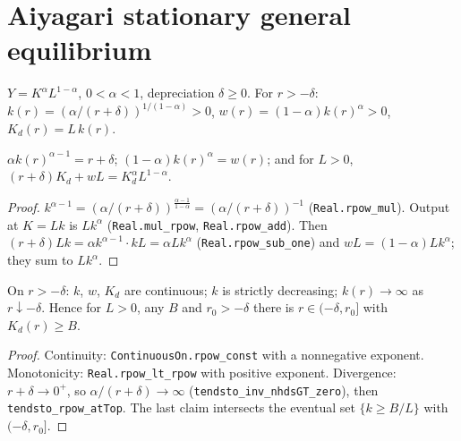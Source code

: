 \section{Aiyagari stationary general equilibrium}
\label{sec:aiyagari_ge}

\begin{definition}
\label{def:cd_firm}
\leanok
$Y = K^\alpha L^{1-\alpha}$, $0<\alpha<1$, depreciation $\delta\ge0$. For $r > -\delta$:
$k(r) = (\alpha/(r+\delta))^{1/(1-\alpha)} > 0$, $w(r) = (1-\alpha)k(r)^\alpha > 0$, $K_d(r) = L\,k(r)$.
\end{definition}

\begin{lemma}
\label{lem:cd_firm_foc}
\leanok
{}
$\alpha k(r)^{\alpha-1} = r+\delta$; $(1-\alpha)k(r)^\alpha = w(r)$; and for $L>0$,
$(r+\delta)K_d + wL = K_d^\alpha L^{1-\alpha}$.
\end{lemma}
\begin{proof}
\leanok
$k^{\alpha-1} = (\alpha/(r+\delta))^{\frac{\alpha-1}{1-\alpha}} = (\alpha/(r+\delta))^{-1}$ (\texttt{Real.rpow\_mul}).
Output at $K = Lk$ is $Lk^\alpha$ (\texttt{Real.mul\_rpow}, \texttt{Real.rpow\_add}). Then
$(r+\delta)Lk = \alpha k^{\alpha-1}\cdot kL = \alpha Lk^\alpha$ (\texttt{Real.rpow\_sub\_one}) and
$wL = (1-\alpha)Lk^\alpha$; they sum to $Lk^\alpha$.
\end{proof}

\begin{lemma}
\label{lem:cd_capdemand}
\leanok
{}
On $r>-\delta$: $k$, $w$, $K_d$ are continuous; $k$ is strictly decreasing; $k(r)\to\infty$ as $r\downarrow-\delta$.
Hence for $L>0$, any $B$ and $r_0 > -\delta$ there is $r\in(-\delta, r_0]$ with $K_d(r)\ge B$.
\end{lemma}
\begin{proof}
\leanok
Continuity: \texttt{ContinuousOn.rpow\_const} with a nonnegative exponent. Monotonicity:
\texttt{Real.rpow\_lt\_rpow} with positive exponent. Divergence: $r+\delta\to0^+$, so
$\alpha/(r+\delta)\to\infty$ (\texttt{tendsto\_inv\_nhdsGT\_zero}), then \texttt{tendsto\_rpow\_atTop}.
The last claim intersects the eventual set $\{k \ge B/L\}$ with $(-\delta, r_0]$.
\end{proof}


